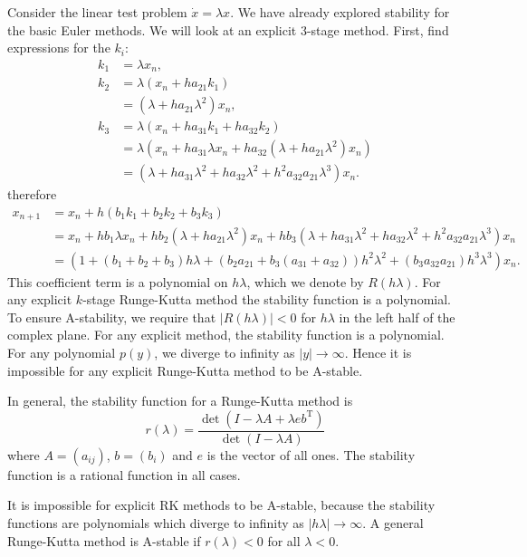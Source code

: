 \documentclass{report}
\theoremstyle{exampstyle} \newtheorem{example}[theorem]{Example}
\theoremstyle{exampstyle} \newtheorem{remark}[theorem]{Remark}
\theoremstyle{exampstyle} \newtheorem{definition}[theorem]{Definition}
\theoremstyle{exampstyle} \newtheorem{lemma}[theorem]{Lemma}
\begin{document}
Consider the linear test problem $\dot{x} = \lambda x$.
We have already explored stability for the basic Euler methods.
We will look at an explicit 3-stage method.
First, find expressions for the $k_i$:
\begin{align*}
	k_1 &= \lambda x_n, \\
	k_2 &= \lambda\left( x_n + h a_{21}k_1 \right) \\
	&= \left( \lambda + h a_{21}\lambda^2 \right)x_n, \\
	k_3 &= \lambda \left( x_n + h a_{31}k_1 + h a_{32}k_2 \right) \\
	&= \lambda \left( x_n + h a_{31} \lambda x_n + h a_{32}\left( \lambda + h a_{21} \lambda^2 \right) x_n \right) \\
	&= \left( \lambda + h a_{31}\lambda^2 + h a_{32}\lambda^2 + h^2 a_{32}a_{21}\lambda^3 \right) x_n.
\end{align*}
therefore
\begin{align*}
	x_{n+1} &= x_n + h \left( b_1 k_1 + b_2 k_2 + b_3 k_3 \right) \\
	&= x_n + h b_1 \lambda x_n + h b_2 \left(\lambda + h a_{21} \lambda^2\right)x_n + hb_3 \left( \lambda + h a_{31} \lambda^2 + h a_{32} \lambda ^2 + h^2 a_{32} a_{21} \lambda^3\right)x_n \\
	&= \left(
		1 + \left( b_1 + b_2 + b_3 \right) h\lambda + \left(
			b_2 a_{21} + b_3 (a_{31} + a_{32})
		\right)h^2\lambda^2 + \left(
			b_3 a_{32} a_{21}
		\right)h^3\lambda^3
	\right)x_n.
\end{align*}
This coefficient term is a polynomial on $h\lambda$, which we denote by $R(h\lambda)$.
For any explicit $k$-stage Runge-Kutta method the stability function is a polynomial.
To ensure A-stability, we require that $|R(h\lambda)| < 0$ for $h \lambda$ in the left half of the complex plane.
For any explicit method, the stability function is a polynomial.
For any polynomial $p(y)$, we diverge to infinity as $|y| \rightarrow \infty$.
Hence it is impossible for any explicit Runge-Kutta method to be A-stable.

In general, the stability function for a Runge-Kutta method is
\begin{equation*}
	r(\lambda) = \frac{\det(I - \lambda A + \lambda eb^\mathrm{T})}{\det(I - \lambda A)}
\end{equation*} %
where $A = (a_{ij})$, $b = (b_i)$ and $e$ is the vector of all ones.
The stability function is a rational function in all cases.

It is impossible for explicit RK methods to be A-stable, because the stability functions are polynomials which diverge to infinity as $|h\lambda| \rightarrow \infty$.
A general Runge-Kutta method is A-stable if $r(\lambda) < 0$ for all $\lambda < 0$.
\end{document}
